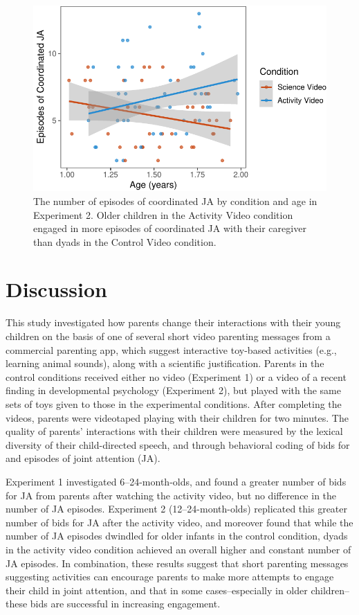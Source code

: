 \documentclass[man,floatsintext]{apa6}
\begin{document}
\begin{figure}[H]

{\centering \includegraphics{figs/e2ja-coord-1} 

}

\caption{\label{fig:e2ja-coord} The number of episodes of coordinated JA by condition and age in Experiment 2. Older children in the Activity Video condition engaged in more episodes of coordinated JA with their caregiver than dyads in the Control Video condition.}\label{fig:e2ja-coord}
\end{figure}

\hypertarget{discussion-1}{%
\section{Discussion}\label{discussion-1}}

This study investigated how parents change their interactions with their young children on the basis of one of several short video parenting messages from a commercial parenting app, which suggest interactive toy-based activities (e.g., learning animal sounds), along with a scientific justification.
Parents in the control conditions received either no video (Experiment 1) or a video of a recent finding in developmental psychology (Experiment 2), but played with the same sets of toys given to those in the experimental conditions.
After completing the videos, parents were videotaped playing with their children for two minutes.
The quality of parents' interactions with their children were measured by the lexical diversity of their child-directed speech, and through behavioral coding of bids for and episodes of joint attention (JA).

Experiment 1 investigated 6--24-month-olds, and found a greater number of bids for JA from parents after watching the activity video, but no difference in the number of JA episodes.
Experiment 2 (12--24-month-olds) replicated this greater number of bids for JA after the activity video, and moreover found that while the number of JA episodes dwindled for older infants in the control condition, dyads in the activity video condition achieved an overall higher and constant number of JA episodes.
In combination, these results suggest that short parenting messages suggesting activities can encourage parents to make more attempts to engage their child in joint attention, and that in some cases--especially in older children--these bids are successful in increasing engagement.
\end{document}
